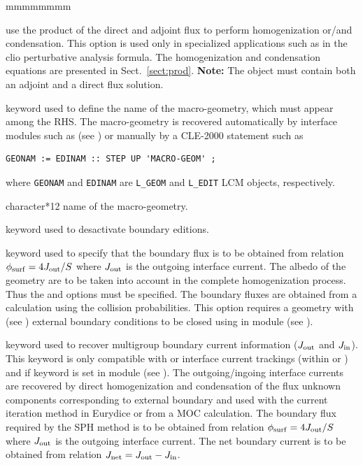 \begin{ListeDeDescription}{mmmmmmmm}
\item[\moc{PROD}] use the product of the direct and adjoint flux to perform homogenization or/and
condensation. This option is used only in specialized applications such as in the {\sc clio} perturbative
analysis formula.\cite{clio} The homogenization and condensation equations are presented in Sect.~\ref{sect:prod}.
{\bf Note:} The  object must contain both an adjoint and a direct flux solution.

\item[\moc{MGEO}] keyword used to define the name of the macro-geometry, which must appear among the RHS. The macro-geometry is recovered automatically
by interface modules such as  (see ) or manually by a CLE-2000 statement such as
\begin{verbatim}
GEONAM := EDINAM :: STEP UP 'MACRO-GEOM' ;
\end{verbatim}
\noindent where {\tt GEONAM} and {\tt EDINAM} are {\tt L\_GEOM} and {\tt L\_EDIT} LCM objects, respectively.

\item[\dusa{MACGEO1}] character*12 name of the macro-geometry.

\item[\moc{NADF}] keyword used to desactivate boundary editions.

\item[\moc{ALBS}] keyword used to specify that the boundary flux is to be obtained from relation
$\phi_{\rm surf}=4J_{\rm out}/S$ where $J_{\rm out}$ is the outgoing interface current. The albedo of
the geometry are to be taken into account in the complete homogenization process. Thus the 
and  options must be specified. The boundary fluxes are obtained from a calculation using the collision
probabilities. This option requires a geometry with  (see ) external boundary conditions to
be closed using  in module  (see ).\cite{ALSB2}

\item[\moc{JOUT}] keyword used to recover multigroup boundary current information ($J_{\rm out}$ and $J_{\rm in}$). This keyword
is only compatible with  or interface current trackings (within  or ) and if keyword  is set in module 
(see ). The outgoing/ingoing interface currents are recovered by direct homogenization and condensation of the
flux unknown components corresponding to external boundary and used with the current iteration method in Eurydice or from a MOC
calculation. The boundary flux required by the SPH method is to be obtained from relation $\phi_{\rm surf}=4J_{\rm out}/S$ where
$J_{\rm out}$ is the outgoing interface current. The net boundary current is to be obtained from relation
$J_{\rm net}=J_{\rm out}-J_{\rm in}$.


\end{ListeDeDescription}
